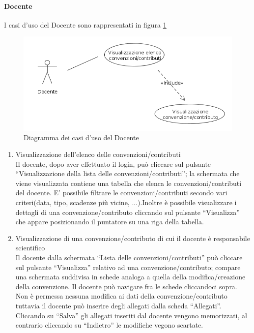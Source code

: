 
\paragraph{Docente}
I casi d'uso del Docente sono rappresentati in figura \ref{use_case_diag_teacher}
\begin{figure}[h]
  \caption{Diagramma dei casi d'uso del Docente}
  \label{use_case_diag_teacher}
  \centering
    \includegraphics[width=1\textwidth]{images/casi_uso_docente.png}
\end{figure}

\begin{enumerate}
 
 \item Visualizzazione dell'elenco delle convenzioni/contributi\\
 
 Il docente, dopo aver effettuato il login, può cliccare sul pulsante ``Visualizzazione della lista delle convenzioni/contributi''; la schermata
 che viene visualizzata contiene una tabella che elenca le convenzioni/contributi del docente. E' possibile filtrare le convenzioni/contributi
 secondo vari criteri(data, tipo, scadenze più vicine, ...).Inoltre è possibile visualizzare i dettagli di una convenzione/contributo cliccando sul
 pulsante ``Visualizza'' che appare posizionando il puntatore su una riga della tabella.
 
 \item Visualizzazione di una convenzione/contributo di cui il docente è responsabile scientifico\\
 
 Il docente dalla schermata ``Lista delle convenzioni/contributi'' può cliccare sul pulsante ``Visualizza'' relativo ad una convenzione/contributo; compare una schermata suddivisa in schede analoga a quella della modifica/creazione
 della convenzione. Il docente può navigare fra le schede cliccandoci sopra. Non è permessa nessuna modifica ai dati della convenzione/contributo tuttavia il docente può inserire degli allegati dalla scheda ``Allegati''. Cliccando su ``Salva''
 gli allegati inseriti dal docente vengono memorizzati, al contrario cliccando su ``Indietro'' le modifiche vegono scartate.
 
 
 
\end{enumerate}




